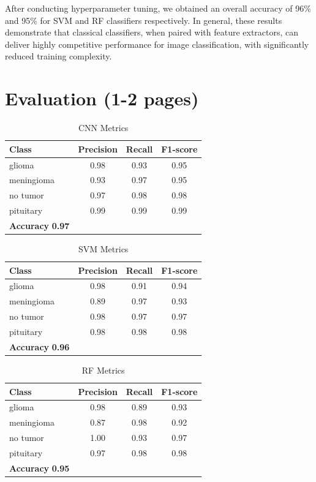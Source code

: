 \documentclass[conference]{IEEEtran}
\begin{document}
After conducting hyperparameter tuning, we obtained an overall accuracy of 96\% and 95\% for SVM and RF classifiers respectively. In general, these results demonstrate that classical classifiers, when paired with feature extractors, can deliver highly competitive performance for image classification, with significantly reduced training complexity.

\section{\large Evaluation (1-2 pages)}

\begin{table}[h!]
\centering
\caption{CNN Metrics}
\begin{tabular}{lccc}
\toprule
\textbf{Class} & \textbf{Precision} & \textbf{Recall} & \textbf{F1-score} \\
\midrule
glioma     & 0.98 & 0.93 & 0.95 \\
meningioma & 0.93 & 0.97 & 0.95 \\
no tumor   & 0.97 & 0.98 & 0.98 \\
pituitary  & 0.99 & 0.99 & 0.99 \\
\midrule
\textbf{Accuracy} \textbf{0.97} \\
\bottomrule
\end{tabular}
\end{table}

\begin{table}[h!]
\centering
\caption{SVM Metrics}
\begin{tabular}{lccc}
\toprule
\textbf{Class} & \textbf{Precision} & \textbf{Recall} & \textbf{F1-score} \\
\midrule
glioma     & 0.98 & 0.91 & 0.94 \\
meningioma & 0.89 & 0.97 & 0.93 \\
no tumor   & 0.98 & 0.97 & 0.97 \\
pituitary  & 0.98 & 0.98 & 0.98 \\
\midrule
\textbf{Accuracy} \textbf{0.96} \\
\bottomrule
\end{tabular}
\end{table}

\begin{table}
\centering
\caption{RF Metrics}
\begin{tabular}{lccc}
\toprule
\textbf{Class} & \textbf{Precision} & \textbf{Recall} & \textbf{F1-score} \\
\midrule
glioma     & 0.98 & 0.89 & 0.93 \\
meningioma & 0.87 & 0.98 & 0.92 \\
no tumor   & 1.00 & 0.93 & 0.97 \\
pituitary  & 0.97 & 0.98 & 0.98 \\
\midrule
\textbf{Accuracy} \textbf{0.95} \\
\bottomrule
\end{tabular}
\end{table}
\end{document}
